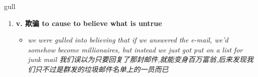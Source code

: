 
\begin{frame}
{\huge gull}
\begin{center}
\begin{enumerate}\Large
  \item \textbf{v. 欺骗 to cause to believe what is untrue}
  \begin{itemize}
    \item \em{\Large{we were gulled into believing that if we answered the e-mail, we'd somehow become millionaires, but instead we just got put on a list for junk mail 我们误以为只要回复了那封邮件,就能变身百万富翁,后来发现我们只不过是群发的垃圾邮件名单上的一员而已}}
  \end{itemize}
\end{enumerate}
\end{center}
\end{frame}
